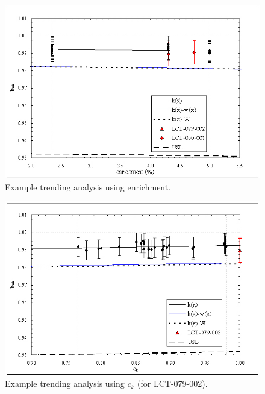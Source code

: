 \begin{figure}[htp] 
    \centering
    \includegraphics[keepaspectratio, width = 5 in]{images/trend_enrich}
    \caption{Example trending analysis using enrichment.}
    \label{fig:trend_enrich}
\end{figure}


\begin{figure}[htp] 
    \centering
    \includegraphics[keepaspectratio, width = 5 in]{images/trend_ck1}
    \caption{Example trending analysis using $c_k$ (for LCT-079-002).}
    \label{fig:trend_ck1}
\end{figure}


